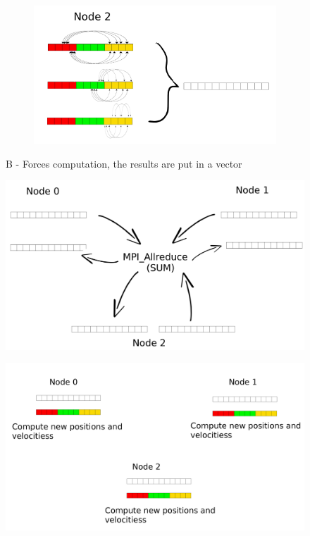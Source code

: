 \documentclass[a4paper]{article}
\begin{document}
\begin{figure}[ht]
\begin{subfigure}{.5\textwidth}
\end{subfigure} \\ %
\begin{subfigure}{\textwidth}
  \centering
  \includegraphics[width=0.5\linewidth]{force_calculation_2}
\end{subfigure}
  \caption{B - Forces computation, the results are put in a vector}
  \label{fig:B2}
\end{figure}
\FloatBarrier

\begin{figure}
\centering
\begin{minipage}{.45\textwidth}
  \centering
  \includegraphics[width=1\linewidth]{MPI_all_reduce}
  \label{fig:C2}
\end{minipage}%
\begin{minipage}{.45\textwidth}
  \centering
  \includegraphics[width=1\linewidth]{compute_positions}
  \label{fig:D2}
\end{minipage}
\end{figure}
\FloatBarrier
\end{document}
